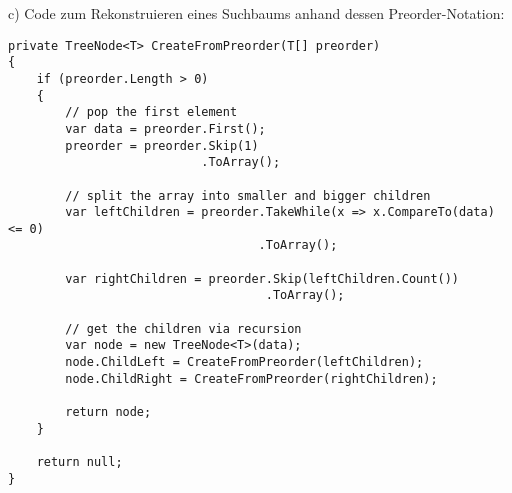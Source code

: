 c) Code zum Rekonstruieren eines Suchbaums anhand dessen Preorder-Notation: 
\begin{verbatim}
private TreeNode<T> CreateFromPreorder(T[] preorder)
{
    if (preorder.Length > 0)
    {
        // pop the first element
        var data = preorder.First();
        preorder = preorder.Skip(1)
                           .ToArray();

        // split the array into smaller and bigger children
        var leftChildren = preorder.TakeWhile(x => x.CompareTo(data) <= 0)
                                   .ToArray();

        var rightChildren = preorder.Skip(leftChildren.Count())
                                    .ToArray();

        // get the children via recursion
        var node = new TreeNode<T>(data);
        node.ChildLeft = CreateFromPreorder(leftChildren);
        node.ChildRight = CreateFromPreorder(rightChildren);

        return node;
    }

    return null;
}
\end{verbatim}
